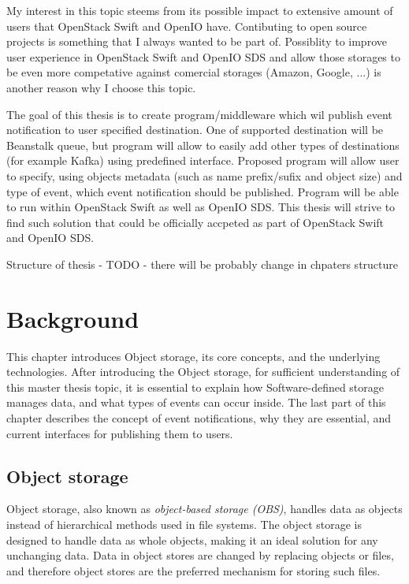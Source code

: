 My interest in this topic steems from its possible impact to extensive amount of users that OpenStack Swift and OpenIO have. Contibuting to open source projects is something that I always wanted to be part of. Possiblity to improve user experience in OpenStack Swift and OpenIO SDS and allow those storages to be even more competative against comercial storages (Amazon, Google, ...) is another reason why I choose this topic.

The goal of this thesis is to create program/middleware which wil publish event notification to user specified destination. One of supported destination will be Beanstalk queue, but program will allow to easily add other types of destinations (for example Kafka) using predefined interface. Proposed program will allow user to specify, using objects metadata (such as name prefix/sufix and object size) and type of event, which event notification should be published. Program will be able to run within OpenStack Swift as well as OpenIO SDS. This thesis will strive to find such solution that could be officially accpeted as part of OpenStack Swift and OpenIO SDS.

Structure of thesis - TODO - there will be probably change in chpaters structure

\chapter{Background}

This chapter introduces Object storage, its core concepts, and the underlying technologies. After introducing the Object storage, for sufficient understanding of this master thesis topic, it is essential to explain how Software-defined storage manages data, and what types of events can occur inside. The last part of this chapter describes the concept of event notifications, why they are essential, and current interfaces for publishing them to users.

\section{Object storage}
    Object storage, also known as \textit{object-based storage (OBS)}, handles data as objects instead of hierarchical methods used in file systems\cite{objectBasedStorage}. The object storage is designed to handle data as whole objects, making it an ideal solution for any unchanging data. Data in object stores are changed by replacing objects or files, and therefore object stores are the preferred mechanism for storing such files\cite{networkStorage}.

